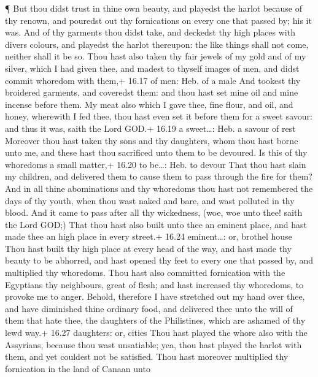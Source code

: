  ¶ But thou didst trust in thine own beauty, and playedst
the harlot because of thy renown, and pouredst out thy fornications on
every one that passed by; his it was.  And of thy garments
thou didst take, and deckedst thy high places with divers colours, and
playedst the harlot thereupon: the like things shall not come, neither
shall it be so.  Thou hast also taken thy fair jewels of my
gold and of my silver, which I had given thee, and madest to thyself
images of men, and didst commit whoredom with them,+ 16.17 of men: Heb.
of a male  And tookest thy broidered garments, and
coveredst them: and thou hast set mine oil and mine incense before them.
 My meat also which I gave thee, fine flour, and oil, and
honey, wherewith I fed thee, thou hast even set it before them for a
sweet savour: and thus it was, saith the Lord GOD.+ 16.19 a sweet\ldots:
Heb. a savour of rest  Moreover thou hast taken thy sons
and thy daughters, whom thou hast borne unto me, and these hast thou
sacrificed unto them to be devoured. Is this of thy whoredoms a small
matter,+ 16.20 to be\ldots: Heb. to devour  That thou hast
slain my children, and delivered them to cause them to pass through the
fire for them?  And in all thine abominations and thy
whoredoms thou hast not remembered the days of thy youth, when thou wast
naked and bare, and wast polluted in thy blood.  And it
came to pass after all thy wickedness, (woe, woe unto thee! saith the
Lord GOD;)  That thou hast also built unto thee an eminent
place, and hast made thee an high place in every street.+ 16.24
eminent\ldots: or, brothel house  Thou hast built thy high
place at every head of the way, and hast made thy beauty to be abhorred,
and hast opened thy feet to every one that passed by, and multiplied thy
whoredoms.  Thou hast also committed fornication with the
Egyptians thy neighbours, great of flesh; and hast increased thy
whoredoms, to provoke me to anger.  Behold, therefore I
have stretched out my hand over thee, and have diminished thine ordinary
food, and delivered thee unto the will of them that hate thee, the
daughters of the Philistines, which are ashamed of thy lewd way.+ 16.27
daughters: or, cities  Thou hast played the whore also with
the Assyrians, because thou wast unsatiable; yea, thou hast played the
harlot with them, and yet couldest not be satisfied.  Thou
hast moreover multiplied thy fornication in the land of Canaan unto

